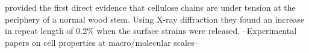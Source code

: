 \cite{Clair_2006} provided the first direct evidence that cellulose chains are under tension at the periphery of a normal wood stem. Using X-ray diffraction they found an increase in repeat length of 0.2\% when the surface strains were released. 
--Experimental papers on cell properties at macro/molecular scales--